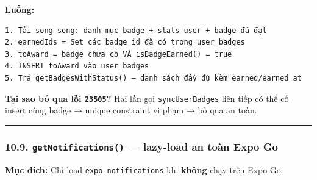 \documentclass[12pt,a4paper]{article}
\newenvironment{Shaded}{%
  \VerbatimEnvironment
  \begin{quote}\small\ttfamily
}{%
  \end{quote}%
}
\begin{document}
\begin{Shaded}
\begin{Highlighting}[]
   \OperatorTok{\textgreater{}} \NormalTok{) \{}
    \NormalTok{(}\NormalTok{)}\NormalTok{(}
\KeywordTok{=\textgreater{}}\OperatorTok{:}\OperatorTok{,}\OperatorTok{:}\NormalTok{ \}))}\OperatorTok{,}
\NormalTok{    )}\OperatorTok{;}
\NormalTok{  \}}
   \OperatorTok{;}
\NormalTok{\}}
\end{Highlighting}
\end{Shaded}

\textbf{Luồng:}

\begin{verbatim}
1. Tải song song: danh mục badge + stats user + badge đã đạt
2. earnedIds = Set các badge_id đã có trong user_badges
3. toAward = badge chưa có VÀ isBadgeEarned() = true
4. INSERT toAward vào user_badges
5. Trả getBadgesWithStatus() — danh sách đầy đủ kèm earned/earned_at
\end{verbatim}

\textbf{Tại sao bỏ qua lỗi \texttt{23505}?} Hai lần gọi
\texttt{syncUserBadges} liên tiếp có thể cố insert cùng badge → unique
constraint vi phạm → bỏ qua an toàn.

\begin{center}\rule{0.5\linewidth}{0.5pt}\end{center}

\subsubsection{\texorpdfstring{10.9. \texttt{getNotifications()} ---
lazy-load an toàn Expo
Go}{10.9. getNotifications() --- lazy-load an toàn Expo Go}}\label{getnotifications-lazy-load-an-touxe0n-expo-go}

\textbf{Mục đích:} Chỉ load \texttt{expo-notifications} khi
\textbf{không} chạy trên Expo Go.
\end{document}
